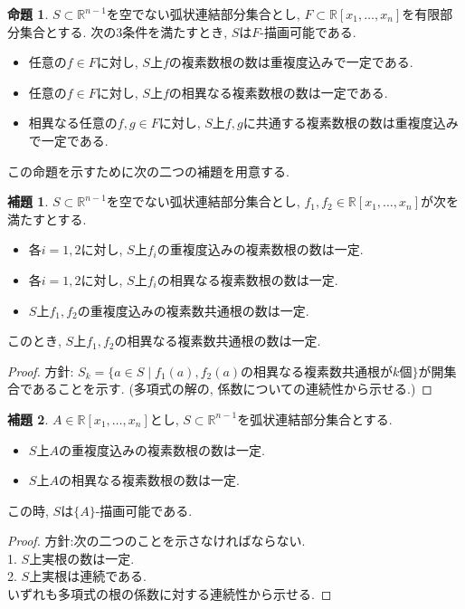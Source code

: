 \documentclass[dvipdfmx,uplatex]{jsarticle}
\newcommand{\R}{\mathbb{R}}
\theoremstyle{definition}
\newtheorem{proposition}{命題}[section]
\newtheorem{lemma}{補題}[section]
\begin{document}
\begin{proposition}
$S \subset \R^{n-1}$を空でない弧状連結部分集合とし, $F \subset \R[x_1, \dots, x_n]$を有限部分集合とする.
次の3条件を満たすとき, $S$は$F$-描画可能である.
\begin{itemize}
\item 任意の$f \in F$に対し, $S$上$f$の複素数根の数は重複度込みで一定である.
\item 任意の$f \in F$に対し, $S$上$f$の相異なる複素数根の数は一定である.
\item 相異なる任意の$f, g \in F$に対し, $S$上$f, g$に共通する複素数根の数は重複度込みで一定である.
\end{itemize}
\end{proposition}

この命題を示すために次の二つの補題を用意する.

\begin{lemma}
$S \subset \R^{n-1}$を空でない弧状連結部分集合とし, $f_1, f_2 \in \R[x_1, \dots, x_n]$が次を満たすとする.
\begin{itemize}
\item 各$i=1,2$に対し, $S$上$f_i$の重複度込みの複素数根の数は一定.
\item 各$i=1,2$に対し, $S$上$f_i$の相異なる複素数根の数は一定.
\item $S$上$f_1, f_2$の重複度込みの複素数共通根の数は一定.
\end{itemize}
このとき, $S$上$f_1, f_2$の相異なる複素数共通根の数は一定.
\end{lemma}
\begin{proof}
方針: $S_k = \{a \in S \mid f_1(a), f_2(a)の相異なる複素数共通根がk個 \}$が開集合であることを示す. (多項式の解の, 係数についての連続性から示せる.)

\end{proof}

\begin{lemma}
$A \in \R[x_1, \dots, x_n]$とし, $S \subset \R^{n-1}$を弧状連結部分集合とする.
\begin{itemize}
\item $S$上$A$の重複度込みの複素数根の数は一定.
\item $S$上$A$の相異なる複素数根の数は一定.
\end{itemize}
この時, $S$は$\{A\}$-描画可能である.
\end{lemma}

\begin{proof}
方針:次の二つのことを示さなければならない.\\
1.  $S$上実根の数は一定.\\
2.  $S$上実根は連続である.\\
いずれも多項式の根の係数に対する連続性から示せる.
\end{proof}
\end{document}
